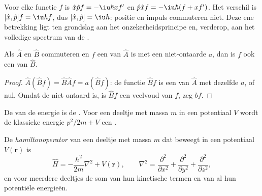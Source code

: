 \begin{example}\label{ex:b3:quantum-model-systems:canonical}
Voor elke functie $f$ is $\hat x\hat pf = -\iu\hbar xf'$ en $\hat p\hat xf =
-\iu\hbar(f + xf')$. Het verschil is $[\hat x,\hat p]f = \iu\hbar f$, dus
$[\hat x,\hat p] = \iu\hbar$: positie en impuls commuteren niet. Deze ene
betrekking ligt ten grondslag aan het onzekerheidsprincipe en, verderop,
aan het volledige spectrum van de .
\end{example}

\begin{proposition}\label{prop:b3:quantum-model-systems:commuting}
Als $\hat A$ en $\hat B$ commuteren en $f$ een  van $\hat A$ is
met een niet-ontaarde  $a$, dan is $f$ ook een  van
$\hat B$.
\end{proposition}

\begin{proof}
$\hat A(\hat Bf) = \hat B\hat Af = a(\hat Bf)$: de functie $\hat Bf$ is een
 van $\hat A$ met dezelfde  $a$, of nul. Omdat de
 niet ontaard is, is $\hat Bf$ een veelvoud van $f$, zeg $bf$.
\end{proof}

De  van de energie is de . Voor een deeltje met
massa $m$ in een potentiaal $V$ wordt de klassieke energie $p^2/2m + V$ een
.

\begin{definition}[Hamiltonoperator]\label{def:b3:quantum-model-systems:schrodinger}
De \emph{hamiltonoperator} van een deeltje met
massa $m$ dat beweegt in een potentiaal $V(\mathbf r)$ is
\[
\hat H = -\frac{\hbar^2}{2m}\nabla^2 + V(\mathbf r), \qquad \nabla^2 =
\frac{\partial^2}{\partial x^2} + \frac{\partial^2}{\partial y^2} +
\frac{\partial^2}{\partial z^2},
\]
en voor meerdere deeltjes de som van hun kinetische termen en van al hun
potentiële energieën.
\end{definition}

